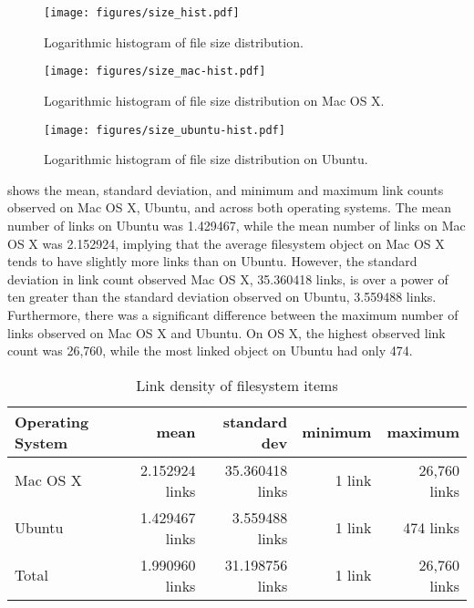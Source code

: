 \documentclass[12pt,letterpaper]{article}
\begin{document}
		\begin{figure}[H]
			\centerline{\texttt{[image: figures/size\_hist.pdf]}}
			\caption{Logarithmic histogram of file size distribution.}
			\label{fig:size_hist}
		\end{figure}

		\begin{figure}[H]
			\centerline{\texttt{[image: figures/size\_mac-hist.pdf]}}
			\caption{Logarithmic histogram of file size distribution on Mac OS X.}
			\label{fig:size_mac-hist}
		\end{figure}

		\begin{figure}[H]
			\centerline{\texttt{[image: figures/size\_ubuntu-hist.pdf]}}
			\caption{Logarithmic histogram of file size distribution on Ubuntu.}
			\label{fig:size_ubuntu-hist}
		\end{figure}

		 shows the mean, standard deviation, and minimum and maximum link counts observed on Mac OS X, Ubuntu, and across both operating systems. The mean number of links on Ubuntu was 1.429467, while the mean number of links on Mac OS X was 2.152924, implying that the average filesystem object on Mac OS X tends to have slightly more links than on Ubuntu. However, the standard deviation in link count observed Mac OS X, 35.360418 links, is over a power of ten greater than the standard deviation observed on Ubuntu, 3.559488 links. Furthermore, there was a significant difference between the maximum number of links observed on Mac OS X and Ubuntu. On OS X, the highest observed link count was 26,760, while the most linked object on Ubuntu had only 474.

		\begin{table}[h]
		\centering
		\caption{Link density of filesystem items}
		\label{table:nlink}
			\begin{tabular}{l r r r r}
			Operating System & mean  & standard dev & minimum & maximum \\
			\hline
			Mac OS X & 2.152924 links & 35.360418 links & 1 link & 26,760 links \\
			Ubuntu &  1.429467 links & 3.559488 links & 1 link & 474 links \\
			Total & 1.990960 links & 31.198756 links & 1 link & 26,760 links \\
			\end{tabular}
		\end{table}
\end{document}
